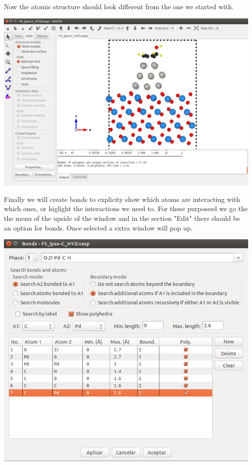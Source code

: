 \documentclass[11pt]{article}
\begin{document}
Now the atomic structure should look different from the one we started with. 

\begin{center}
\includegraphics[width=.9\linewidth]{./figures/VESTA/04_edited_properties.png}
\end{center}

Finally we will create bonds to explicity show which atoms are interacting with which ones, or higlight the interactions we need to. For these purposesd we go the the menu of the upside of the window and in the section "Edit" there should be an option for bonds. Once selected a extra window will pop up.

\begin{center}
\includegraphics[width=.9\linewidth]{./figures/VESTA/05_bond_propertiespng.png}
\end{center}
\end{document}
